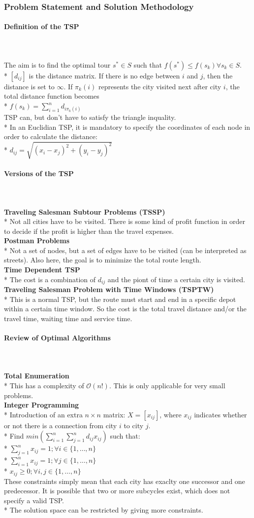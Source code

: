 \documentclass[12pt]{article}
\newcommand{\myparagraph}[1]{\paragraph{#1}\mbox{}\\\\}
\newcommand{\mysubparagraph}[1]{\textbf{#1}\mbox{}\\*}
\begin{document}
\subsubsection{Problem Statement and Solution Methodology}
\myparagraph{Definition of the TSP}
The aim is to find the optimal tour $s^* \in S$ such that $f(s^*) \leq f(s_k) \forall s_k \in S$.\\*
$[d_{ij}]$ is the distance matrix. If there is no edge between $i$ and $j$, then the distance is set to $\infty$. If $\pi_k(i)$ represents the city visited next after city $i$, the total distance function becomes\\*
$f(s_k) = \sum_{i=1}^nd_{i\pi_k(i)}$\\
TSP can, but don't have to satisfy the triangle inquality.\\*
In an Euclidian TSP, it is mandatory to specify the coordinates of each node in order to calculate the distance:\\*
$d_{ij} = \sqrt{(x_i-x_j)^2 + (y_i - y_j)^2}$
\myparagraph{Versions of the TSP}
\mysubparagraph{Traveling Salesman Subtour Problems (TSSP)}
Not all cities have to be visited. There is some kind of profit function in order to decide if the profit is higher than the travel expenses.\\
\mysubparagraph{Postman Problems}
Not a set of nodes, but a set of edges have to be visited (can be interpreted as streets). Also here, the goal is to minimize the total route length.\\
\mysubparagraph{Time Dependent TSP}
The cost is a combination of $d_{ij}$ and the piont of time a certain city is visited.\\
\mysubparagraph{Traveling Salesman Problem with Time Windows (TSPTW)}
This is a normal TSP, but the route must start and end in a specific depot within a certain time window. So the cost is the total travel distance and/or the travel time, waiting time and service time.
\myparagraph{Review of Optimal Algorithms}
\mysubparagraph{Total Enumeration}
This has a complexity of $\mathcal{O}(n!)$. This is only applicable for very small problems.\\
\mysubparagraph{Integer Programming}
Introduction of an extra $n \times n$ matrix: $X = [x_{ij}]$, where $x_{ij}$ indicates whether or not there is a connection from city $i$ to city $j$.\\*
Find $min(\sum_{i=1}^n\sum_{j=1}^nd_{ij}x_{ij})$ such that:\\*
$\sum_{j=1}^nx_{ij} = 1; \forall i \in \{1, \dots, n\}$\\*
$\sum_{i=1}^nx_{ij} = 1; \forall j \in \{1, \dots, n\}$\\*
$x_{ij} \geq 0; \forall i,j \in \{1, \dots, n\}$\\
These constraints simply mean that each city has exaclty one successor and one predecessor.
It is possible that two or more subcycles exist, which does not specify a valid TSP.\\*
The solution space can be restricted by giving more constraints.
\end{document}
